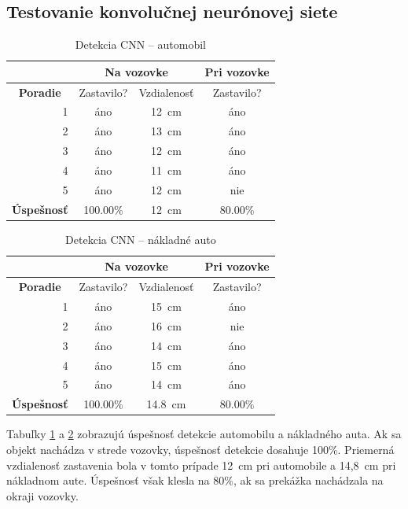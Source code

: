 \subsection{Testovanie konvolučnej neurónovej siete}
\begin{table}[!ht]
\caption{Detekcia CNN -- automobil}
\label{tab:cnn1}
\centering
\begin{tabular}{|l r|c|c|c|}
        \hline
        \multicolumn{2}{|c|}{} & \multicolumn{2}{c|}{Na vozovke} & Pri vozovke \\ \hline
        \multicolumn{2}{|c|}{\textbf{Poradie}} & Zastavilo? & Vzdialenosť & Zastavilo? \\ \hline
        & 1 & áno & 12~cm & áno \\ \hline
        & 2 & áno & 13~cm & áno \\ \hline
        & 3 & áno & 12~cm & áno \\ \hline
        & 4 & áno & 11~cm & áno \\ \hline
        & 5 & áno & 12~cm & nie \\ \hline
        \multicolumn{2}{|l|}{\textbf{Úspešnosť}} & 100.00\% & 12~cm & 80.00\% \\ \hline
\end{tabular}
\end{table}
\clearpage
\begin{table}[!ht]
\caption{Detekcia CNN -- nákladné auto}
\label{tab:cnn2}
\centering
\begin{tabular}{|l r|c|c|c|}
        \hline
        \multicolumn{2}{|c|}{} & \multicolumn{2}{c|}{Na vozovke} & Pri vozovke \\ \hline
        \multicolumn{2}{|c|}{\textbf{Poradie}} & Zastavilo? & Vzdialenosť & Zastavilo? \\ \hline
        & 1 & áno & 15~cm & áno \\ \hline
        & 2 & áno & 16~cm & nie \\ \hline
        & 3 & áno & 14~cm & áno \\ \hline
        & 4 & áno & 15~cm & áno \\ \hline
        & 5 & áno & 14~cm & áno \\ \hline
        \multicolumn{2}{|l|}{\textbf{Úspešnosť}} & 100.00\% & 14.8~cm & 80.00\% \\ \hline
\end{tabular}
\end{table}
Tabuľky \ref{tab:cnn1} a \ref{tab:cnn2} zobrazujú úspešnosť detekcie automobilu a nákladného auta. Ak sa objekt nachádza v strede vozovky, úspešnosť detekcie dosahuje 100\%. Priemerná vzdialenosť zastavenia bola v tomto prípade 12~cm pri automobile a 14,8~cm pri nákladnom aute. Úspešnosť však klesla na 80\%, ak sa prekážka nachádzala na okraji vozovky.\par
